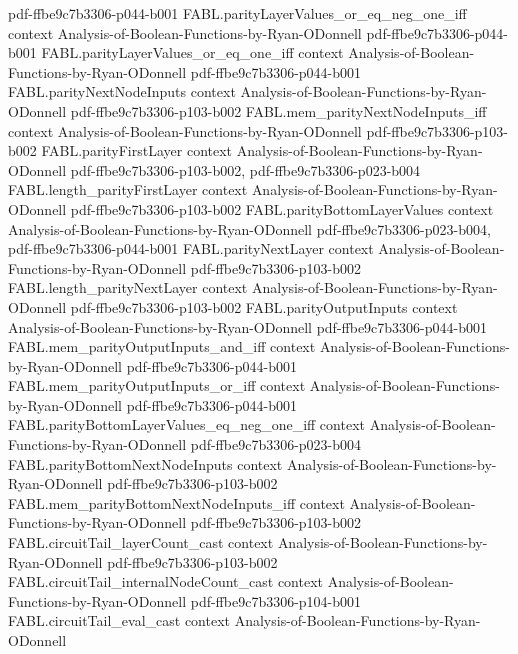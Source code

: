 \begin{theorem}
  {pdf-ffbe9c7b3306-p044-b001}
\proofstep
  {FABL.parityLayerValues_or_eq_neg_one_iff}
  {context}
  {Analysis-of-Boolean-Functions-by-Ryan-ODonnell}
  {pdf-ffbe9c7b3306-p044-b001}
\proofstep
  {FABL.parityLayerValues_or_eq_one_iff}
  {context}
  {Analysis-of-Boolean-Functions-by-Ryan-ODonnell}
  {pdf-ffbe9c7b3306-p044-b001}
\proofstep
  {FABL.parityNextNodeInputs}
  {context}
  {Analysis-of-Boolean-Functions-by-Ryan-ODonnell}
  {pdf-ffbe9c7b3306-p103-b002}
\proofstep
  {FABL.mem_parityNextNodeInputs_iff}
  {context}
  {Analysis-of-Boolean-Functions-by-Ryan-ODonnell}
  {pdf-ffbe9c7b3306-p103-b002}
\proofstep
  {FABL.parityFirstLayer}
  {context}
  {Analysis-of-Boolean-Functions-by-Ryan-ODonnell}
  {pdf-ffbe9c7b3306-p103-b002,
    pdf-ffbe9c7b3306-p023-b004}
\proofstep
  {FABL.length_parityFirstLayer}
  {context}
  {Analysis-of-Boolean-Functions-by-Ryan-ODonnell}
  {pdf-ffbe9c7b3306-p103-b002}
\proofstep
  {FABL.parityBottomLayerValues}
  {context}
  {Analysis-of-Boolean-Functions-by-Ryan-ODonnell}
  {pdf-ffbe9c7b3306-p023-b004,
    pdf-ffbe9c7b3306-p044-b001}
\proofstep
  {FABL.parityNextLayer}
  {context}
  {Analysis-of-Boolean-Functions-by-Ryan-ODonnell}
  {pdf-ffbe9c7b3306-p103-b002}
\proofstep
  {FABL.length_parityNextLayer}
  {context}
  {Analysis-of-Boolean-Functions-by-Ryan-ODonnell}
  {pdf-ffbe9c7b3306-p103-b002}
\proofstep
  {FABL.parityOutputInputs}
  {context}
  {Analysis-of-Boolean-Functions-by-Ryan-ODonnell}
  {pdf-ffbe9c7b3306-p044-b001}
\proofstep
  {FABL.mem_parityOutputInputs_and_iff}
  {context}
  {Analysis-of-Boolean-Functions-by-Ryan-ODonnell}
  {pdf-ffbe9c7b3306-p044-b001}
\proofstep
  {FABL.mem_parityOutputInputs_or_iff}
  {context}
  {Analysis-of-Boolean-Functions-by-Ryan-ODonnell}
  {pdf-ffbe9c7b3306-p044-b001}
\proofstep
  {FABL.parityBottomLayerValues_eq_neg_one_iff}
  {context}
  {Analysis-of-Boolean-Functions-by-Ryan-ODonnell}
  {pdf-ffbe9c7b3306-p023-b004}
\proofstep
  {FABL.parityBottomNextNodeInputs}
  {context}
  {Analysis-of-Boolean-Functions-by-Ryan-ODonnell}
  {pdf-ffbe9c7b3306-p103-b002}
\proofstep
  {FABL.mem_parityBottomNextNodeInputs_iff}
  {context}
  {Analysis-of-Boolean-Functions-by-Ryan-ODonnell}
  {pdf-ffbe9c7b3306-p103-b002}
\proofstep
  {FABL.circuitTail_layerCount_cast}
  {context}
  {Analysis-of-Boolean-Functions-by-Ryan-ODonnell}
  {pdf-ffbe9c7b3306-p103-b002}
\proofstep
  {FABL.circuitTail_internalNodeCount_cast}
  {context}
  {Analysis-of-Boolean-Functions-by-Ryan-ODonnell}
  {pdf-ffbe9c7b3306-p104-b001}
\proofstep
  {FABL.circuitTail_eval_cast}
  {context}
  {Analysis-of-Boolean-Functions-by-Ryan-ODonnell}

\end{theorem}

